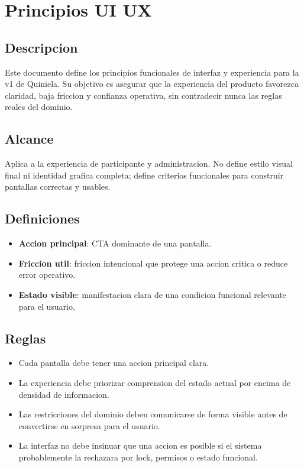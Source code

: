 \section{Principios UI UX}

\subsection{Descripcion}

Este documento define los principios funcionales de interfaz y experiencia para la v1 de Quiniela. Su objetivo es asegurar que la experiencia del producto favorezca claridad, baja friccion y confianza operativa, sin contradecir nunca las reglas reales del dominio.

\subsection{Alcance}

Aplica a la experiencia de participante y administracion. No define estilo visual final ni identidad grafica completa; define criterios funcionales para construir pantallas correctas y usables.

\subsection{Definiciones}

\begin{itemize}
  \item \textbf{Accion principal}: CTA dominante de una pantalla.
  \item \textbf{Friccion util}: friccion intencional que protege una accion critica o reduce error operativo.
  \item \textbf{Estado visible}: manifestacion clara de una condicion funcional relevante para el usuario.
\end{itemize}

\subsection{Reglas}

\begin{itemize}
  \item Cada pantalla debe tener una accion principal clara.
  \item La experiencia debe priorizar comprension del estado actual por encima de densidad de informacion.
  \item Las restricciones del dominio deben comunicarse de forma visible antes de convertirse en sorpresa para el usuario.
  \item La interfaz no debe insinuar que una accion es posible si el sistema probablemente la rechazara por lock, permisos o estado funcional.
\end{itemize}

